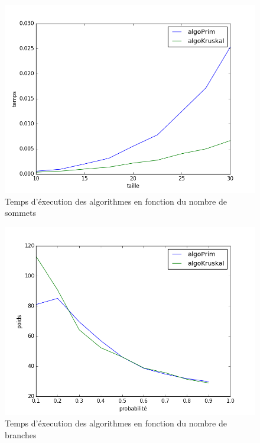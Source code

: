 \documentclass[a4paper,10pt]{report}
\begin{document}
\begin{center}
  \begin{figure}[ht]
    \label{color}
    \includegraphics[scale=0.5]{temps(taille).png}
    \caption{Temps d'éxecution des algorithmes en fonction du nombre de sommets}
  \end{figure} 
\end{center}

\begin{center}
  \begin{figure}[ht]
    \label{color}
    \includegraphics[scale=0.5]{poids(probabilite).png}
    \caption{Temps d'éxecution des algorithmes en fonction du nombre de branches}
  \end{figure} 
\end{center}
\end{document}
